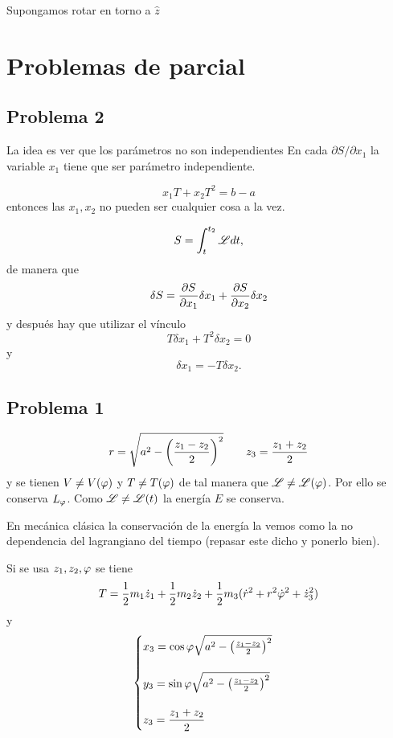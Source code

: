 \documentclass[10pt,oneside]{CBFT_book}
\begin{document}
Supongamos rotar en torno a $\hat{z}$


\section{Problemas de parcial}


\subsection{Problema 2}

La idea es ver que los parámetros no son independientes
En cada $\partial S / \partial x_1$ la variable $x_1$ tiene que ser parámetro independiente.

\[
	x_1 T + x_2 T^2 = b - a
\]
entonces las $x_1, x_2$ no pueden ser cualquier cosa a la vez.

\[
	S = \int_t^{t_2} \mathscr{L} dt,
\]
de manera que 
\[
	\delta S = \frac{\partial^{\hspace{-0.05em}} {S}}{\partial {x_1}^{\hspace{-0.05em}}} \delta x_1 + \frac{\partial^{\hspace{-0.05em}} {S}}{\partial {x_2}^{\hspace{-0.05em}}} \delta x_2
\]
y después hay que utilizar el vínculo
\[
	T \delta x_1 + T^2 \delta x_2 = 0
\]
y
\[
	\delta x_1 = -T \delta x_2.
\]

\subsection{Problema 1}

\[
	r = \sqrt{ a^2 - \left( \frac{ z_1-z_2 }{ 2 } \right)^2 } \qquad z_3 = \frac{ z_1+ z_2}{2}
\]
y se tienen $V \neq V(\varphi)$ y $T \neq T(\varphi)$ de tal manera que $\mathscr{L} \neq \mathscr{L}(\varphi)$. Por ello se conserva $L_\varphi$.
Como $\mathscr{L} \neq \mathscr{L}(t)$ la energía $E$ se conserva.

En mecánica clásica la conservación de la energía la vemos como la no dependencia del lagrangiano del tiempo (repasar este dicho 
y ponerlo bien).

Si se usa $z_1,z_2,\varphi$ se tiene 
\[
	T = \frac 1 2 m_1 \dot{z}_1 + \frac 1 2 m_2 \dot{z}_2 + \frac 1 2 m_3 ( \dot{r}^2 + r^2 \dot{\varphi}^2 + \dot{z}_3^2 )
\]
y
\[
	\begin{cases}
	 x_3 = \cos \varphi \sqrt{ a^2 - \left( \frac{ z_1-z_2 }{ 2 } \right)^2 } \\
	 \\
	 y_3 = \sin \varphi \sqrt{ a^2 - \left( \frac{ z_1-z_2 }{ 2 } \right)^2 } \\
	 \\
	 z_3 = \displaystyle \frac{ z_1+ z_2}{2}
	\end{cases}
\]
\end{document}
